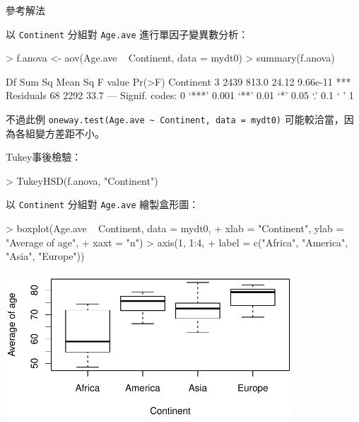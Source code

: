 \documentclass[12pt, aspectratio=43]{beamer}
\begin{document}
\begin{frame}{參考解法}
\framebreak

以 \verb+Continent+ 分組對 \verb+Age.ave+ 進行單因子變異數分析：
\begin{RC}
> f.anova <- aov(Age.ave ~ Continent, data = mydt0)
> summary(f.anova)
\end{RC}
\begin{R}
            Df Sum Sq Mean Sq F value   Pr(>F)    
Continent    3   2439   813.0   24.12 9.66e-11 ***
Residuals   68   2292    33.7                     
---
Signif. codes:  0 ‘***’ 0.001 ‘**’ 0.01 ‘*’ 0.05 ‘.’ 0.1 ‘ ’ 1
\end{R}
不過此例 \verb+oneway.test(Age.ave ~ Continent, data = mydt0)+ 可能較洽當，因為各組變方差距不小。

\framebreak

Tukey事後檢驗：
\begin{RC}
> TukeyHSD(f.anova, "Continent")
\end{RC}

\framebreak

以 \verb+Continent+ 分組對 \verb+Age.ave+ 繪製盒形圖：
\begin{RC}
> boxplot(Age.ave ~ Continent, data = mydt0,
+         xlab = "Continent", ylab = "Average of age",
+         xaxt = "n")
> axis(1, 1:4, 
+      label = c("Africa", "America", "Asia", "Europe"))
\end{RC}
\begin{center}\includegraphics[width=0.8\textwidth]{Rplot-test-anova.pdf}\end{center}


\end{frame}
\end{document}
